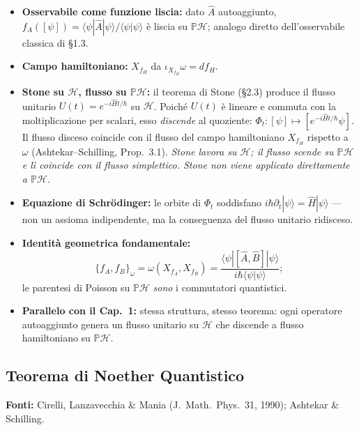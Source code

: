 \documentclass[12pt, a4paper]{article}
\newcommand{\fonti}[1]{%
	\begin{fontebox}
		\textcolor{fontecolor}{\footnotesize\textbf{Fonti:} #1}
	\end{fontebox}%
}
\begin{document}
	\begin{itemize}
		\item \textbf{Osservabile come funzione liscia:} dato $\hat A$ autoaggiunto,
		$f_A([\psi])=\langle\psi|\hat A|\psi\rangle/\langle\psi|\psi\rangle$ è liscia
		su $\mathbb{P}\mathcal{H}$; analogo diretto dell'osservabile classica di \S1.3.
		\item \textbf{Campo hamiltoniano:} $X_{f_H}$ da $\iota_{X_{f_H}}\omega=df_H$.
		\item \textbf{Stone su $\mathcal{H}$, flusso su $\mathbb{P}\mathcal{H}$:}
		il teorema di Stone (\S2.3) produce il flusso unitario $U(t)=e^{-i\hat Ht/\hbar}$
		su $\mathcal{H}$. Poiché $U(t)$ è lineare e commuta con la moltiplicazione per
		scalari, esso \emph{discende} al quoziente: $\Phi_t:[\psi]\mapsto[e^{-i\hat Ht/\hbar}
		\psi]$. Il flusso disceso coincide con il flusso del campo hamiltoniano $X_{f_H}$
		rispetto a $\omega$ (Ashtekar--Schilling, Prop.~3.1). \emph{Stone lavora su
			$\mathcal{H}$; il flusso scende su $\mathbb{P}\mathcal{H}$ e lì coincide con
			il flusso simplettico. Stone non viene applicato direttamente a
			$\mathbb{P}\mathcal{H}$.}
		\item \textbf{Equazione di Schrödinger:} le orbite di $\Phi_t$ soddisfano
		$i\hbar\partial_t|\psi\rangle=\hat H|\psi\rangle$ --- non un assioma indipendente,
		ma la conseguenza del flusso unitario ridisceso.
		\item \textbf{Identità geometrica fondamentale:}
		\[
		\{f_A,f_B\}_\omega = \omega(X_{f_A},X_{f_B}) = \frac{\langle\psi|[\hat A,\hat B]|\psi\rangle}{i\hbar \langle\psi | \psi \rangle};
		\]
		le parentesi di Poisson su $\mathbb{P}\mathcal{H}$ \emph{sono} i commutatori
		quantistici.
		\item \textbf{Parallelo con il Cap.~1:} stessa struttura, stesso teorema: ogni
		operatore autoaggiunto genera un flusso unitario su $\mathcal{H}$ che discende
		a flusso hamiltoniano su $\mathbb{P}\mathcal{H}$.
	\end{itemize}
	
	\subsection{Teorema di Noether Quantistico}
	
	\fonti{Cirelli, Lanzavecchia \& Mania (J.\ Math.\ Phys.\ 31, 1990);
		Ashtekar \& Schilling.}
	
\end{document}
